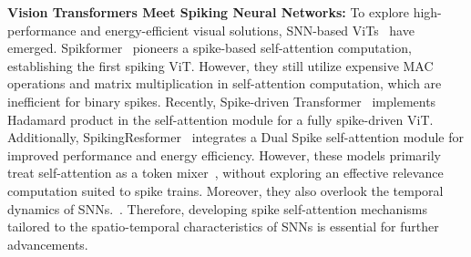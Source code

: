 \textbf{Vision Transformers Meet Spiking Neural Networks:} To explore high-performance and energy-efficient visual solutions, SNN-based ViTs~\citep{zhouspikformer, wang2023complex} have emerged.
Spikformer~\citep{zhouspikformer,zhou2023spikingformer} pioneers a spike-based self-attention computation, establishing the first spiking ViT. 
However, they still utilize expensive MAC operations and matrix multiplication in self-attention computation, which are inefficient for binary spikes. 
Recently, Spike-driven Transformer~\citep{yao2024spike} implements Hadamard product in the self-attention module for a fully spike-driven ViT. Additionally,  SpikingResformer~\citep{shi2024spikingresformer} integrates a Dual Spike self-attention module for improved performance and energy efficiency. However, these models primarily treat self-attention as a token mixer~\citep{yu2022metaformer}, without exploring an effective relevance computation suited to spike trains. Moreover, they also overlook the temporal dynamics of SNNs.~\citep{zhang2021rectified, bohte2000spikeprop}. Therefore, developing spike self-attention mechanisms tailored to the spatio-temporal characteristics of SNNs is essential for further advancements.